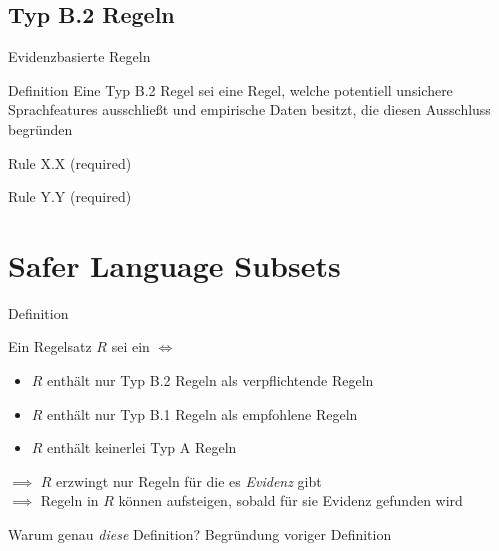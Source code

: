\documentclass{beamer}
\begin{document}
    \subsection{Typ B.2 Regeln}
    \label{subsec:typ-b-2-regeln}
    \begin{frame}{Evidenzbasierte Regeln}
         {
            \begin{block}{Definition}
                Eine Typ B.2 Regel sei eine Regel, welche potentiell unsichere Sprachfeatures ausschließt und empirische
                Daten besitzt, die diesen Ausschluss begründen
            \end{block}
            \pause
            \begin{exampleblock}{Rule X.X (required)} %
            \end{exampleblock}
        }
         {
            \begin{exampleblock}{Rule Y.Y (required)}
                
            \end{exampleblock}
        }
    \end{frame}

    \section{Safer Language Subsets}
    \label{sec:safer-language-subsets}
    \begin{frame}{Definition}
        \begin{block}{Ein Regelsatz $R$ sei ein \sls $\iff$}
            \begin{itemize}
                \item $R$ enthält nur Typ B.2 Regeln als verpflichtende Regeln
                \item $R$ enthält nur Typ B.1 Regeln als empfohlene Regeln
                \item $R$ enthält keinerlei Typ A Regeln
            \end{itemize}
        \end{block}
        $\implies$ $R$ erzwingt nur Regeln für die es \textit{Evidenz} gibt\\
        $\implies$ Regeln in $R$ können aufsteigen, sobald für sie Evidenz gefunden wird
    \end{frame}

    \begin{frame}{Warum genau \textit{diese} Definition?}
        Begründung voriger Definition
    \end{frame}
\end{document}
